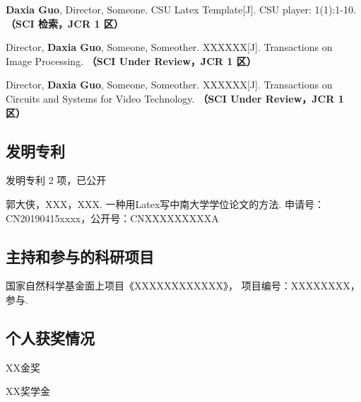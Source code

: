 \else
\begin{enumerate}[label={[\arabic*]}]
\item \textbf{Daxia Guo}, Director, Someone. CSU Latex Template[J]. CSU player: 1(1):1-10. {\bfseries \heiti（SCI 检索，JCR 1 区）}
\item Director, \textbf{Daxia Guo}, Someone, Someother. XXXXXX[J]. Transactions on Image Processing. {\bfseries \heiti（SCI Under Review，JCR 1 区）}
\item Director, \textbf{Daxia Guo}, Someone, Someother. XXXXXX[J]. Transactions on Circuits and Systems for Video Technology. {\bfseries \heiti（SCI Under Review，JCR 1 区）}
\end{enumerate}
\fi
\subsection*{发明专利}
\ifblindreview
\noindent
发明专利 2 项，已公开
\else
\begin{enumerate}[label={[\arabic*]}]
\item 郭大侠，XXX，XXX. 一种用Latex写中南大学学位论文的方法. 申请号：CN20190415xxxx，公开号：CNXXXXXXXXXA
\end{enumerate}
\fi

\ifblindreview
\else
\subsection*{主持和参与的科研项目}
\begin{enumerate}[label={[\arabic*]}]
\item 国家自然科学基金面上项目《XXXXXXXXXXXX》， 项目编号：XXXXXXXX，参与.
\end{enumerate}

\subsection*{个人获奖情况}
\noindent
\begin{enumerate}[label={[\arabic*]}]
\item XX金奖
\item XX奖学金
\end{enumerate}
\fi

\newpage

\ifblindreview
\else
\section{\hspace*{-2.5em}{致~~~~谢}} %
\lipsum
\newpage
\fi